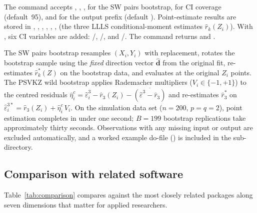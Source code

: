 \documentclass[article]{jss}
\begin{document}
\begin{sloppypar}
The  command accepts ,
, ,
 for the SW pairs bootstrap,
 for CI coverage (default~95), and
 for the output prefix (default ).
Point-estimate results are stored in ,
, , ,
, , 
(the three LLLS conditional-moment estimates $\hat r_k(Z_i)$).
With , six CI variables are added:
/,
/, and
/.
The  command returns
 and .
\end{sloppypar}

The SW pairs bootstrap \citep{SimarWilson2023} resamples $(X_i, Y_i)$
with replacement, rotates the bootstrap sample using the \emph{fixed}
direction vector $\hat{\mathbf{d}}$ from the original fit,
re-estimates $\hat{r}_k^*(Z)$ on the bootstrap data,
and evaluates at the original $Z_i$ points.
The PSVKZ wild bootstrap \citep{PSVKZ2024} applies Rademacher
multipliers ($V_i \in \{-1,+1\}$) to the centred residuals
$\hat\eta_i^c = \hat\varepsilon_i^3 - \hat r_3(Z_i) -
\overline{(\hat\varepsilon^3 - \hat r_3)}$
and re-estimates $\hat r_3^*$ on
$\hat\varepsilon_i^{3*} = \hat r_3(Z_i) + \hat\eta_i^c\,V_i$.
On the simulation data set ($n=200$, $p=q=2$), point estimation
completes in under one second; $B=199$ bootstrap replications
take approximately thirty seconds.
Observations with any missing input or output are excluded
automatically, and a worked example do-file
() is included in the
 sub-directory.


\subsection{Comparison with related software}
\label{sec:comparison}

Table~\ref{tab:comparison} compares  against the most closely
related packages along seven dimensions that matter for applied researchers.
\end{document}

